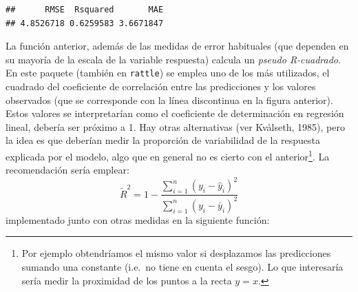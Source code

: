 \documentclass[
]{book}
\theoremstyle{break}
\theoremstyle{definition}
\theoremstyle{definition}
\theoremstyle{definition}
\theoremstyle{definition}
\theoremstyle{remark}
\begin{document}
\begin{verbatim}
##      RMSE  Rsquared       MAE 
## 4.8526718 0.6259583 3.6671847
\end{verbatim}

La función anterior, además de las medidas de error habituales (que dependen en su mayoría de la escala de la variable respuesta) calcula un \emph{pseudo R-cuadrado}.
En este paquete (también en \texttt{rattle}) se emplea uno de los más utilizados, el cuadrado del coeficiente de correlación entre las predicciones y los valores observados (que se corresponde con la línea discontinua en la figura anterior).
Estos valores se interpretarían como el coeficiente de determinación en regresión lineal, debería ser próximo a 1.
Hay otras alternativas (ver Kvålseth, 1985), pero la idea es que deberían medir la proporción de variabilidad de la respuesta explicada por el modelo, algo que en general no es cierto con el anterior\footnote{Por ejemplo obtendríamos el mismo valor si desplazamos las predicciones sumando una constante (i.e.~no tiene en cuenta el sesgo). Lo que interesaría sería medir la proximidad de los puntos a la recta \(y=x\).}.
La recomendación sería emplear:
\[\tilde R^2 = 1 - \frac{\sum_{i=1}^n(y_i - \hat y_i)^2}{\sum_{i=1}^n(y_i - \bar y_i)^2}\]
implementado junto con otras medidas en la siguiente función:
\end{document}
